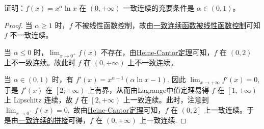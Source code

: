 \documentclass[../../main.tex]{subfiles}%
\begin{document}
\begin{example}
证明：\( f(x) = x^{\alpha} \ln x \) 在 \( (0, +\infty) \) 一致连续的充要条件是 \( \alpha \in (0,1) \)。
\end{example}
\begin{proof}

当 $\alpha \geqslant 1$ 时，$f$ 不被线性函数控制，故由\hyperref[corollary:一致连续函数被线性函数控制1]{一致连续函数被线性函数控制}可知 $f$ 不一致连续。

当 $\alpha \leqslant 0$ 时，$\lim_{x \rightarrow 0^+} f\left( x \right)$ 不存在，由\hyperref[theroem:Heine-Cantor定理]{Heine-Cantor定理}可知，$f$ 在 $\left( 0,2 \right)$ 上不一致连续。故此时 $f$ 在 $\left( 0,+\infty \right)$ 上不一致连续。

当 $\alpha \in \left( 0,1 \right)$ 时，有
\(
f'\left( x \right) = x^{\alpha - 1} \left( \alpha \ln x - 1 \right).
\)
因此
\(
\lim_{x \rightarrow +\infty} f'\left( x \right) = 0,
\)
于是 $f'\left( x \right)$ 在 $\left[ 2,+\infty \right)$ 上有界，从而由Lagrange中值定理易得 $f$ 在 $\left[ 1,+\infty \right)$ 上 Lipschitz 连续，故 $f$ 在 $\left[ 2,+\infty \right)$ 上一致连续。此时，注意到
\(
\lim_{x \rightarrow 0^+} f\left( x \right) = 0,
\)
故由\hyperref[theroem:Heine-Cantor定理]{Heine-Cantor定理}可知，$f$ 在 $\left( 0,2 \right]$ 上一致连续。于是由\hyperref[proposition:一致连续函数的拼接]{一致连续的拼接}可得，$f$ 在 $\left( 0,+\infty \right)$ 上一致连续.

\end{proof}
\end{document}

